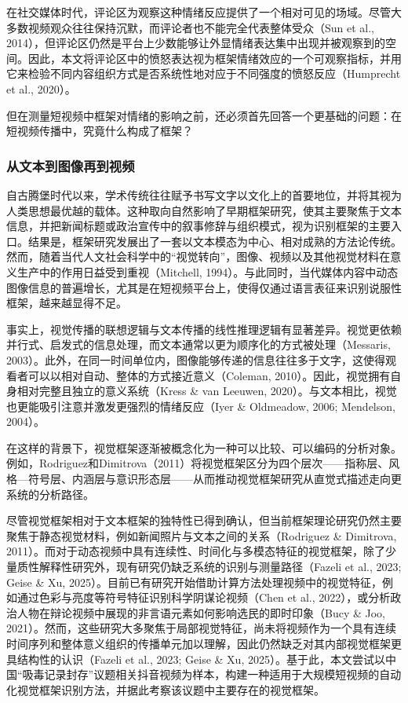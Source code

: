 \documentclass[
]{article}
\begin{document}
在社交媒体时代，评论区为观察这种情绪反应提供了一个相对可见的场域。尽管大多数视频观众往往保持沉默，而评论者也不能完全代表整体受众（Sun
et al.,
2014），但评论区仍然是平台上少数能够让外显情绪表达集中出现并被观察到的空间。因此，本文将评论区中的愤怒表达视为框架情绪效应的一个可观察指标，并用它来检验不同内容组织方式是否系统性地对应于不同强度的愤怒反应（Humprecht
et al., 2020）。

但在测量短视频中框架对情绪的影响之前，还必须首先回答一个更基础的问题：在短视频传播中，究竟什么构成了框架？

\subsubsection{从文本到图像再到视频}\label{ux4eceux6587ux672cux5230ux56feux50cfux518dux5230ux89c6ux9891}

自古腾堡时代以来，学术传统往往赋予书写文字以文化上的首要地位，并将其视为人类思想最优越的载体。这种取向自然影响了早期框架研究，使其主要聚焦于文本信息，并把新闻标题或政治宣传中的叙事修辞与组织模式，视为识别框架的主要入口。结果是，框架研究发展出了一套以文本模态为中心、相对成熟的方法论传统。然而，随着当代人文社会科学中的``视觉转向''，图像、视频以及其他视觉材料在意义生产中的作用日益受到重视（Mitchell,
1994）。与此同时，当代媒体内容中动态图像信息的普遍增长，尤其是在短视频平台上，使得仅通过语言表征来识别说服性框架，越来越显得不足。

事实上，视觉传播的联想逻辑与文本传播的线性推理逻辑有显著差异。视觉更依赖并行式、启发式的信息处理，而文本通常以更为顺序化的方式被处理（Messaris,
2003）。此外，在同一时间单位内，图像能够传递的信息往往多于文字，这使得观看者可以以相对自动、整体的方式接近意义（Coleman,
2010）。因此，视觉拥有自身相对完整且独立的意义系统（Kress \& van
Leeuwen,
2020）。与文本相比，视觉也更能吸引注意并激发更强烈的情绪反应（Iyer \&
Oldmeadow, 2006; Mendelson, 2004）。

在这样的背景下，视觉框架逐渐被概念化为一种可以比较、可以编码的分析对象。例如，Rodriguez和Dimitrova（2011）将视觉框架区分为四个层次------指称层、风格---符号层、内涵层与意识形态层------从而推动视觉框架研究从直觉式描述走向更系统的分析路径。

尽管视觉框架相对于文本框架的独特性已得到确认，但当前框架理论研究仍然主要聚焦于静态视觉材料，例如新闻照片与文本之间的关系（Rodriguez
\& Dimitrova,
2011）。而对于动态视频中具有连续性、时间化与多模态特征的视觉框架，除了少量质性解释性研究外，现有研究仍缺乏系统的识别与测量路径（Fazeli
et al., 2023; Geise \& Xu,
2025）。目前已有研究开始借助计算方法处理视频中的视觉特征，例如通过色彩与亮度等符号特征识别科学阴谋论视频（Chen
et al.,
2022），或分析政治人物在辩论视频中展现的非言语元素如何影响选民的即时印象（Bucy
\& Joo,
2021）。然而，这些研究大多聚焦于局部视觉特征，尚未将视频作为一个具有连续时间序列和整体意义组织的传播单元加以理解，因此仍然缺乏对其内部视觉框架更具结构性的认识（Fazeli
et al., 2023; Geise \& Xu,
2025）。基于此，本文尝试以中国``吸毒记录封存''议题相关抖音视频为样本，构建一种适用于大规模短视频的自动化视觉框架识别方法，并据此考察该议题中主要存在的视觉框架。
\end{document}
